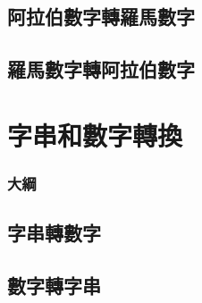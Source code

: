 \documentclass[utf8]{beamer}
\begin{document}
\begin{CJK}{UTF8}{bkai}
\subsection{阿拉伯數字轉羅馬數字}

\subsection{羅馬數字轉阿拉伯數字}

\section{字串和數字轉換}
\begin{frame}
  \frametitle{大綱}
  \begin{multicols}{2}
    \tableofcontents[currentsection]
  \end{multicols}
\end{frame}

\subsection{字串轉數字}

\subsection{數字轉字串}

\clearpage
\end{CJK}
\end{document}
